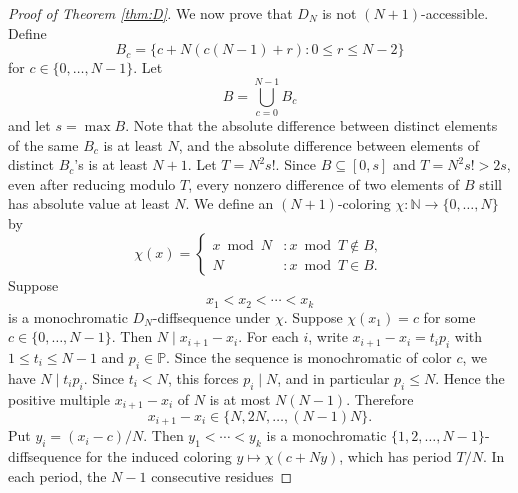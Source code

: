 \documentclass{amsart}
\theoremstyle{definition}
\begin{document}
\begin{proof}[Proof of Theorem \ref{thm:D}]
We now prove that $D_N$ is not $(N+1)$-accessible. Define $$B_c=\{c+N(c(N-1)+r):0\leq r\leq N-2\}$$ for $c \in \{0,\dots,N-1\}$. Let $$B=\bigcup_{c=0}^{N-1}B_c$$ and let $s=\max B.$ Note that the absolute difference between distinct elements of the same $B_c$ is at least $N$, and the absolute difference between elements of distinct $B_c$'s is at least $N+1$. Let $T=N^2s!$. Since $B\subseteq [0,s]$ and $T=N^2s!>2s$, even after reducing modulo $T$, every nonzero difference of two elements of $B$ still has absolute value at least $N$. We define an $(N+1)$-coloring $\chi : \mathbb{N} \to \{0,\dots,N\}$ by $$\chi(x)=\begin{cases}
    x\bmod N & : x\bmod T \notin B, \\
    N & : x\bmod T \in B.
\end{cases}$$ Suppose $$x_1<x_2<\cdots<x_k$$ is a monochromatic $D_N$-diffsequence under $\chi$. Suppose $\chi(x_1)=c$ for some $c \in \{0,\dots,N-1\}$. Then $N \mid x_{i+1}-x_i$. For each $i$, write $x_{i+1}-x_i=t_i p_i$ with $1\leq t_i\leq N-1$ and $p_i\in\mathbb{P}$. Since the sequence is monochromatic of color $c$, we have $N\mid t_i p_i$. Since $t_i<N$, this forces $p_i\mid N$, and in particular $p_i\leq N$. Hence the positive multiple $x_{i+1}-x_i$ of $N$ is at most $N(N-1)$. Therefore $$x_{i+1}-x_i \in \{N,2N,\dots,(N-1)N\}.$$ Put $y_i=(x_i-c)/N$. Then $y_1<\cdots<y_k$ is a monochromatic $\{1,2,\dots,N-1\}$-diffsequence for the induced coloring $y\mapsto \chi(c+Ny)$, which has period $T/N$. In each period, the $N-1$ consecutive residues

\end{proof}
\end{document}
